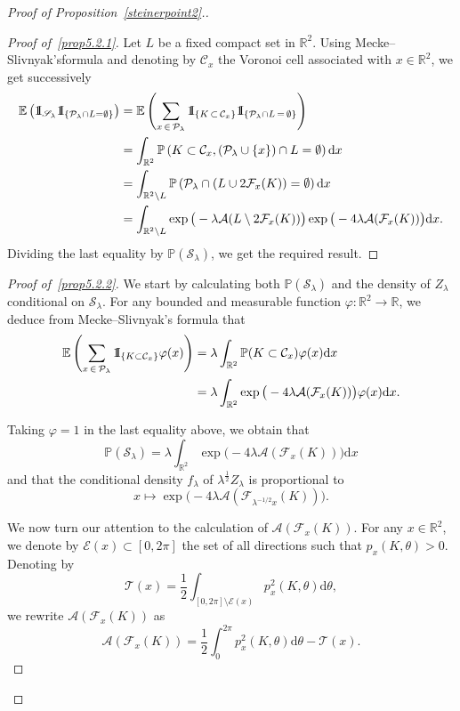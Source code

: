 \documentclass[AHL,Unicode,longabstracts,published]{cedram}
\newcommand{\indic}{1\negthickspace\text{I}}
\newcommand{\cA}{\mathcal{A}}
\newcommand{\cC}{\mathcal{C}}
\newcommand{\cE}{\mathcal{E}}
\newcommand{\cF}{\mathcal{F}}
\newcommand{\cP}{\mathcal{P}}
\newcommand{\scS}{\mathscr{S}}
\newcommand{\cT}{\mathcal{T}}
\newcommand{\dd}{\mathrm{d}}
\newcommand{\E}{\mathbb{E}}
\renewcommand{\P}{\mathbb{P}}
\newcommand{\R}{\mathbb{R}}
\newcommand{\pass}{\vspace{0.3cm}\noindent}
\newenvironment*{prooff}{\begin{proof}}{\let\qed\relax\end{proof}}
\newenvironment*{lastprooff}{\begin{proof}}{\end{proof}}
\newcommand{\R}{\mathbb{R}}
\begin{document}
\begin{proof}[{Proof of Proposition~\ref{steinerpoint2}.}]

\begin{prooff}[{Proof of~\eqref{prop5.2.1}}]
Let $L$ be a fixed compact set in $\R^2$. Using Mecke--Slivnyak's\linebreak formula and denoting by $\cC_x$ the Voronoi cell associated with $x\in\R^2$, we get successively
\begin{align*}
\E\left(\indic_{\scS_{\lambda}}\indic_{\left\{\cP_{\lambda}\cap L=\emptyset\right\}}\right) & = \E\left(\sum_{x\,\in\,\cP_{\lambda}}\indic_{\left\{K\,\subset\,\cC_x\right\}}\indic_{\{\cP_{\lambda}\cap L\,=\,\emptyset\}}\right)\\
& =\int_{\R^2} \P\left(K\subset \cC_x,(\cP_{\lambda}\cup\{x\})\cap L=\emptyset\right)\dd x\\
& =\int_{\R^2\setminus L}\P\left(\cP_{\lambda}\cap (L\cup 2\cF_x(K))=\emptyset\right)\dd x\\
& =\int_{\R^2\setminus L}\exp\big(-\lambda\cA(L\setminus 2\cF_x(K))\big)\exp\big(-4\lambda\cA(\cF_x(K))\big)\dd x.
\end{align*}
Dividing the last equality by $\P(\scS_{\lambda})$, we get the required result.
\end{prooff}

\begin{lastprooff}[{Proof of~\eqref{prop5.2.2}}]
We start by calculating both $\P(\scS_{\lambda})$ and the density of $Z_{\lambda}$ conditional on $\scS_{\lambda}$. For any bounded and measurable function $\varphi:\R^2\longrightarrow \R$, we deduce from Mecke--Slivnyak's formula that
\begin{align*}
\E\left(\sum_{x\,\in\,\cP_{\lambda}}\indic_{\left\{K\subset \cC_x\right\}}\varphi(x)\right) &=\lambda\int_{\R^2} \P(K \subset \cC_x) \varphi(x) \dd x\\
 &=\lambda\int_{\R^2} \exp\big(-4\lambda\cA(\cF_x(K))\big) \varphi(x) \dd x.
\end{align*}

Taking $\varphi=1$ in the last equality above, we obtain that
\begin{equation*}
\P(\scS_{\lambda})=\lambda\int_{\R^2}\exp\big(-4\lambda\cA(\cF_x(K))\big)\dd x
\end{equation*}
and that the conditional density $f_{{\lambda}}$
of $\lambda^{\frac12}Z_{\lambda}$ is proportional to
\[
x\longmapsto\exp\big(-4\lambda\cA(\cF_{\lambda^{-1/2}x}(K))\big).
\]

We now turn our attention to the calculation of $\cA(\cF_x(K))$. For any $x\in \R^2$, we denote by $\cE(x)\subset [0,2\pi]$ the set of all directions such that $p_x(K,\theta)> 0$. Denoting by
\begin{equation*}\label{eq:resteairefleur}
{\cT}(x)=\frac1{2}\int_{[0,2\pi]\setminus\cE(x)}p_x^2(K,\theta)\dd \theta,
\end{equation*}
we rewrite $\cA(\cF_x(K))$ as
\begin{equation*}
\cA(\cF_x(K)) =\frac1{2}\int_0^{2\pi}p_x^2(K,\theta)\dd\theta-{\cT}(x).
\end{equation*}


\end{lastprooff}
\end{proof}
\end{document}
